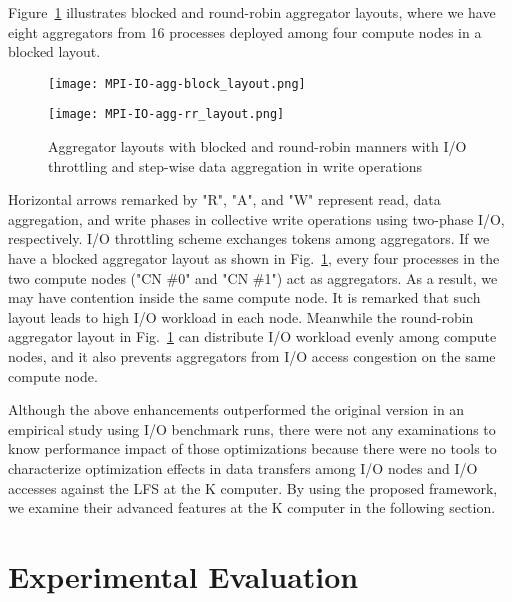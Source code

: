 \documentclass{jhps}
\begin{document}
Figure~\ref{fig:AGG_RR_LAYOUT} illustrates blocked and round-robin
aggregator layouts, where we have eight aggregators from 16 processes
deployed among four compute nodes in a blocked layout.
%
\begin{figure}[htb]
\centering
\begin{minipage}[t]{0.36\textwidth}
\centering
\texttt{[image: MPI-IO-agg-block\_layout.png]}
\label{fig:BLK_LAYOUT}
\end{minipage}
\noindent
\begin{minipage}[t]{0.36\textwidth}
\centering
\texttt{[image: MPI-IO-agg-rr\_layout.png]}
\label{fig:RR_LAYOUT}
\end{minipage}
\caption{Aggregator layouts with blocked and round-robin manners with
I/O throttling and step-wise data aggregation in write operations}
\label{fig:AGG_RR_LAYOUT}
\end{figure}
%
Horizontal arrows remarked by "R", "A", and "W" represent
read, data aggregation, and write phases in collective write
operations using two-phase I/O, respectively.
I/O throttling scheme exchanges tokens among aggregators.
If we have a blocked aggregator layout as shown in
Fig.~\ref{fig:AGG_RR_LAYOUT},
every four processes in the two compute nodes ("CN \#0" and "CN \#1")
act as aggregators.
As a result, we may have contention inside the same compute node.
It is remarked that such layout leads to high I/O workload
in each node.
Meanwhile the round-robin aggregator layout in
Fig.~\ref{fig:AGG_RR_LAYOUT}
can distribute I/O workload evenly
among compute nodes, and it also prevents aggregators
from I/O access congestion on the same compute node.

Although the above enhancements outperformed the original version
in an empirical study using I/O benchmark runs, there were not any examinations
to know performance impact of those optimizations because there were no tools
to characterize optimization effects in data transfers among I/O nodes and
I/O accesses against the LFS at the K computer.
By using the proposed framework, we examine their advanced features at the K computer
in the following section.

\section{Experimental Evaluation}
\label{sec:EVAL}
\end{document}
